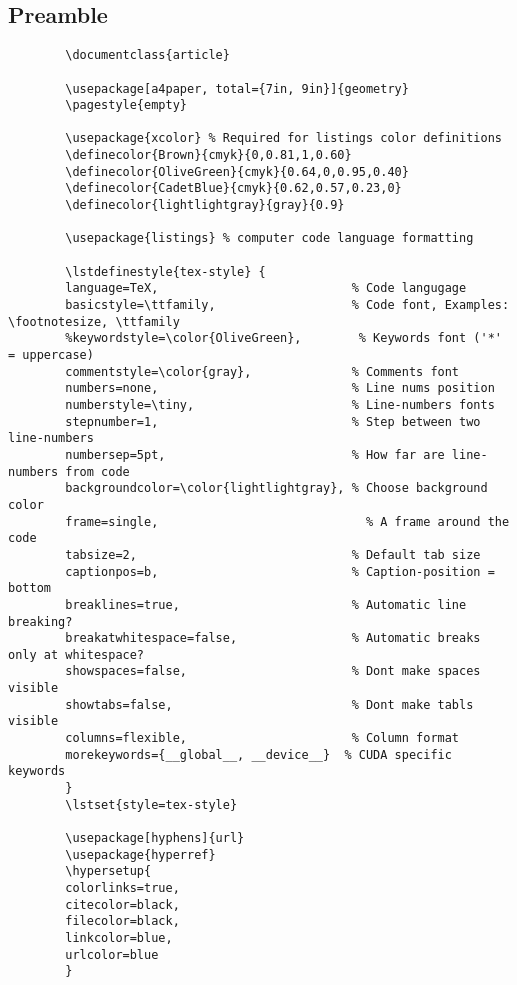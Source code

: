 \documentclass{article}
\begin{document}
	\subsection*{Preamble}
	\begin{lstlisting}
		\documentclass{article}
		
		\usepackage[a4paper, total={7in, 9in}]{geometry}
		\pagestyle{empty}
		
		\usepackage{xcolor} % Required for listings color definitions
		\definecolor{Brown}{cmyk}{0,0.81,1,0.60}
		\definecolor{OliveGreen}{cmyk}{0.64,0,0.95,0.40}
		\definecolor{CadetBlue}{cmyk}{0.62,0.57,0.23,0}
		\definecolor{lightlightgray}{gray}{0.9}
		
		\usepackage{listings} % computer code language formatting
		
		\lstdefinestyle{tex-style} {
		language=TeX,                           % Code langugage
		basicstyle=\ttfamily,                   % Code font, Examples: \footnotesize, \ttfamily
		%keywordstyle=\color{OliveGreen},        % Keywords font ('*' = uppercase)
		commentstyle=\color{gray},              % Comments font
		numbers=none,                           % Line nums position
		numberstyle=\tiny,                      % Line-numbers fonts
		stepnumber=1,                           % Step between two line-numbers
		numbersep=5pt,                          % How far are line-numbers from code
		backgroundcolor=\color{lightlightgray}, % Choose background color
		frame=single,                             % A frame around the code
		tabsize=2,                              % Default tab size
		captionpos=b,                           % Caption-position = bottom
		breaklines=true,                        % Automatic line breaking?
		breakatwhitespace=false,                % Automatic breaks only at whitespace?
		showspaces=false,                       % Dont make spaces visible
		showtabs=false,                         % Dont make tabls visible
		columns=flexible,                       % Column format
		morekeywords={__global__, __device__}  % CUDA specific keywords
		}
		\lstset{style=tex-style}
		
		\usepackage[hyphens]{url}
		\usepackage{hyperref}
		\hypersetup{
		colorlinks=true,
		citecolor=black,
		filecolor=black,
		linkcolor=blue,
		urlcolor=blue
		}
	\end{lstlisting}
	
\end{document}
